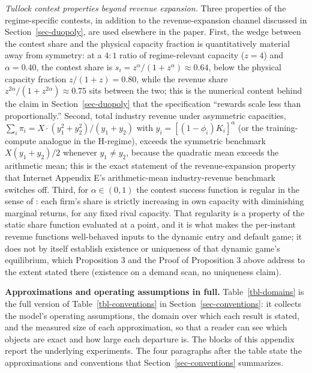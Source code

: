 \documentclass[
  11pt,
  letterpaper,
]{scrartcl}
\begin{document}
\emph{Tullock contest properties beyond revenue expansion.} Three
properties of the regime-specific contests, in addition to the
revenue-expansion channel discussed in Section~\ref{sec-duopoly}, are
used elsewhere in the paper. First, the wedge between the contest share
and the physical capacity fraction is quantitatively material away from
symmetry: at a \(4\!:\!1\) ratio of regime-relevant capacity (\(z = 4\))
and \(\alpha = 0.40\), the contest share is
\(s_i = z^\alpha/(1+z^\alpha) \approx 0.64\), below the physical
capacity fraction \(z/(1+z) = 0.80\), while the revenue share
\(z^{2\alpha}/(1+z^{2\alpha}) \approx 0.75\) sits between the two; this
is the numerical content behind the claim in Section~\ref{sec-duopoly}
that the specification ``rewards scale less than proportionally.''
Second, total industry revenue under asymmetric capacities,
\(\sum_i \pi_i = X \cdot (y_1^2 + y_2^2)/(y_1 + y_2)\) with
\(y_i = [(1-\phi_i)K_i]^\alpha\) (or the training-compute analogue in
the H-regime), exceeds the symmetric benchmark \(X(y_1+y_2)/2\) whenever
\(y_1 \neq y_2\), because the quadratic mean exceeds the arithmetic
mean; this is the exact statement of the revenue-expansion property that
Internet Appendix E's arithmetic-mean industry-revenue benchmark
switches off. Third, for \(\alpha \in (0,1)\) the contest success
function is regular in the sense of \citet{skaperdas1996contest}: each
firm's share is strictly increasing in own capacity with diminishing
marginal returns, for any fixed rival capacity. That regularity is a
property of the static share function evaluated at a point, and it is
what makes the per-instant revenue functions well-behaved inputs to the
dynamic entry and default game; it does not by itself establish
existence or uniqueness of that dynamic game's equilibrium, which
Proposition 3 and the Proof of Proposition 3 above address to the extent
stated there (existence on a demand scan, no uniqueness claim).

\textbf{Approximations and operating assumptions in full.}
Table~\ref{tbl-domains} is the full version of
Table~\ref{tbl-conventions} in Section~\ref{sec-conventions}: it
collects the model's operating assumptions, the domain over which each
result is stated, and the measured size of each approximation, so that a
reader can see which objects are exact and how large each departure is.
The blocks of this appendix report the underlying experiments. The four
paragraphs after the table state the approximations and conventions that
Section~\ref{sec-conventions} summarizes.
\end{document}
